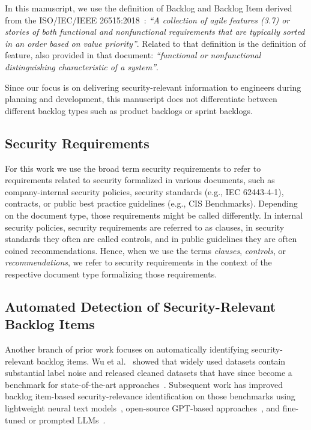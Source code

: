In this manuscript, we use the definition of Backlog and Backlog Item derived from the ISO/IEC/IEEE 26515:2018~\cite{iso2018sse}: \textit{``A collection of agile features (3.7) or stories of both functional and nonfunctional requirements that are typically sorted in an order based on value priority''}.
Related to that definition is the definition of feature, also provided in that document: \textit{``functional or nonfunctional distinguishing characteristic of a system''}.

Since our focus is on delivering security-relevant information to engineers during planning and development, this manuscript does not differentiate between different backlog types such as product backlogs or sprint backlogs.

\subsection{Security Requirements}
For this work we use the broad term security requirements to refer to requirements related to security formalized in various documents, such as company-internal security policies, security standards (e.g., IEC 62443-4-1), contracts, or public best practice guidelines (e.g., CIS Benchmarks). Depending on the document type, those requirements might be called differently. In internal security policies, security requirements are referred to as clauses, in security standards they often are called controls, and in public guidelines they are often coined recommendations. Hence, when we use the terms \textit{clauses}, \textit{controls}, or \textit{recommendations}, we refer to security requirements in the context of the respective document type formalizing those requirements.

\subsection{Automated Detection of Security-Relevant Backlog Items}

Another branch of prior work focuses on automatically identifying security-relevant backlog items.
Wu et al.~\cite{wu2022data-quality} showed that widely used datasets contain substantial label noise and released cleaned datasets that have since become a benchmark for state-of-the-art approaches~\cite{alqahtani2024fasttext, franca2025gpts, soltaniani2026evaluating-llms}.
Subsequent work has improved backlog item-based security-relevance identification on those benchmarks using lightweight neural text models~\cite{alqahtani2024fasttext}, open-source GPT-based approaches~\cite{franca2025gpts}, and fine-tuned or prompted LLMs~\cite{soltaniani2026evaluating-llms}.

